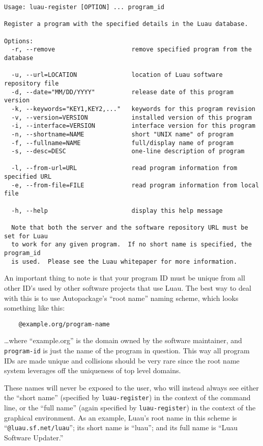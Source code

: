 \documentclass{report}
\begin{document}
{\footnotesize
\begin{verbatim}
Usage: luau-register [OPTION] ... program_id

Register a program with the specified details in the Luau database.

Options:
  -r, --remove                     remove specified program from the database

  -u, --url=LOCATION               location of Luau software repository file
  -d, --date="MM/DD/YYYY"          release date of this program version
  -k, --keywords="KEY1,KEY2,..."   keywords for this program revision
  -v, --version=VERSION            installed version of this program
  -i, --interface=VERSION          interface version for this program
  -n, --shortname=NAME             short "UNIX name" of program
  -f, --fullname=NAME              full/display name of program
  -s, --desc=DESC                  one-line description of program

  -l, --from-url=URL               read program information from specified URL
  -e, --from-file=FILE             read program information from local file

  -h, --help                       display this help message

  Note that both the server and the software repository URL must be set for Luau
  to work for any given program.  If no short name is specified, the program_id
  is used.  Please see the Luau whitepaper for more information.
\end{verbatim}
}

An important thing to note is that your program ID must be unique from all other ID's used by other software projects that use Luau.  The best way to deal with this is to use Autopackage's ``root name'' naming scheme, which looks something like this:

\begin{verbatim}
	@example.org/program-name
\end{verbatim}

\ldots where ``example.org'' is the domain owned by the software maintainer, and \texttt{program-id} is just the name of the program in question.  This way all program IDs are made unique and collisions should be very rare since the root name system leverages off the uniqueness of top level domains.

These names will never be exposed to the user, who will instead always see either the ``short name'' (specified by \texttt{luau-register}) in the context of the command line, or the ``full name'' (again specified by \texttt{luau-register}) in the context of the graphical environment.  As an example, Luau's root name in this scheme is ``\verb+@luau.sf.net/luau+''; its short name is ``luau''; and its full name is ``Luau Software Updater.''
\end{document}
